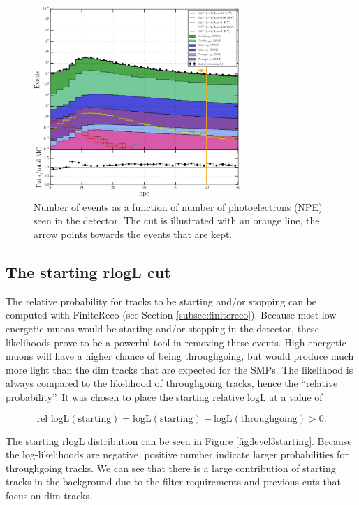 \begin{figure}[t]
\centering
\includegraphics[width=0.7\textwidth]{chapter8/img/L3_zenithcut_gr_1p4835298642_rloglcut_less_15_1D_stack_npe_new.png}
\caption{Number of events as a function of number of photoelectrons (NPE) seen in the detector. The cut is illustrated with an orange line, the arrow points towards the events that are kept.}
\label{fig:level3npe}
\end{figure}

\subsection{The starting rlogL cut}
The relative probability for tracks to be starting and/or stopping can be computed with FiniteReco (see Section \ref{subsec:finitereco}). Because most low-energetic muons would be starting and/or stopping in the detector, these likelihoods prove to be a powerful tool in removing these events. High energetic muons will have a higher chance of being throughgoing, but would produce much more light than the dim tracks that are expected for the SMPs. The likelihood is always compared to the likelihood of throughgoing tracks, hence the ``relative probability''. It was chosen to place the starting relative logL at a value of 

\begin{equation}
\textrm{rel\_logL}(\textrm{starting}) = \textrm{logL}(\textrm{starting}) - \textrm{logL}(\textrm{throughgoing}) > 0. 
\end{equation}

The starting rlogL distribution can be seen in Figure \ref{fig:level3starting}. Because the log-likelihoods are negative, positive number indicate larger probabilities for throughgoing tracks. We can see that there is a large contribution of starting tracks in the background due to the filter requirements and previous cuts that focus on dim tracks.


